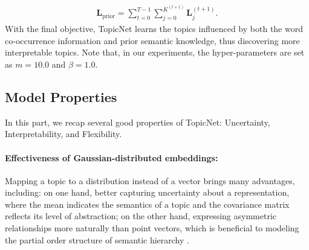 \documentclass{article}
\newcommand{\Amat}[0]{\ensuremath{{\bf A}}}
\newcommand{\Xmat}[0]{\ensuremath{{\bf X}} }
\newcommand{\Lv}[0]{\ensuremath{\boldsymbol{L}} }
\newcommand{\mz}[1]{{\color{red}{[mz:#1]}}}
\begin{document}
\begin{align}\label{eq:prior_loss}
\Lv _{\text{prior}} = \sum\nolimits_{t = 0}^{T - 1} {\sum\nolimits_{j = 0}^{{K^{\left( {t + 1} \right)}}} {\Lv_j^{\left( {t + 1} \right)}} }.
\end{align}
With the final objective, TopicNet learns the topics influenced by both the word co-occurrence information and prior semantic knowledge, thus discovering more interpretable topics. Note that, in our experiments, the hyper-parameters are set as $m = 10.0$ and $\beta =1.0$.
\subsection{Model Properties} 
In this part, we recap several good properties of TopicNet: Uncertainty, Interpretability, and Flexibility.

\paragraph{Effectiveness of Gaussian-distributed embeddings:} Mapping a topic to a distribution instead of a vector brings many advantages, including: on  one hand, better capturing uncertainty about a representation, where the mean indicates the semantics of a topic and the covariance matrix reflects its level of abstraction; on the other hand, expressing asymmetric relationships more naturally than point vectors, which is beneficial to modeling the partial order structure of semantic hierarchy \cite{vilnis2014word,athiwaratkun2018hierarchical}.
\end{document}
